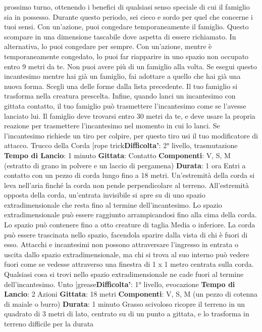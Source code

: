 \begin{multicols}{2}
prossimo turno, ottenendo i benefici di qualsiasi senso
speciale di cui il famiglio sia in possesso. Durante
questo periodo, sei cieco e sordo per quel che
concerne i tuoi sensi.
Con un’azione, puoi congedare temporaneamente il
famiglio. Questo scompare in una dimensione tascabile
dove aspetta di essere richiamato. In alternativa, lo puoi
congedare per sempre. Con un’azione, mentre è
temporaneamente congedato, lo puoi far riapparire in
uno spazio non occupato entro 9 metri da te.
Non puoi avere più di un famiglio alla volta. Se esegui
questo incantesimo mentre hai già un famiglio, fai
adottare a quello che hai già una nuova forma. Scegli
una delle forme dalla lista precedente. Il tuo famiglio si
trasforma nella creatura prescelta.
Infine, quando lanci un incantesimo con gittata contatto,
il tuo famiglio può trasmettere l’incantesimo come se
l’avesse lanciato lui. Il famiglio deve trovarsi entro 30
metri da te, e deve usare la propria reazione per
trasmettere l’incantesimo nel momento in cui lo lanci.
Se l’incantesimo richiede un tiro per colpire, per questo
tiro usi il tuo modificatore di attacco.
Trucco della Corda
[rope trick\textbf{Difficolta'}:
2° livello, trasmutazione
\textbf{Tempo di Lancio}: 1 minuto
\textbf{Gittata}: Contatto
\textbf{Componenti}: V, S, M (estratto di grano in polvere e un
laccio di pergamena)
\textbf{Durata}: 1 ora
Entri a contatto con un pezzo di corda lungo fino a 18
metri. Un’estremità della corda si leva nell’aria finché la
corda non pende perpendicolare al terreno.
All’estremità opposta della corda, un’entrata invisibile si
apre su di uno spazio extradimensionale che resta fino
al termine dell’incantesimo.
Lo spazio extradimensionale può essere raggiunto
arrampicandosi fino alla cima della corda. Lo spazio
può contenere fino a otto creature di taglia Media o
inferiore. La corda può essere trascinata nello spazio,
facendola sparire dalla vista di chi è fuori di esso.
Attacchi e incantesimi non possono attraversare
l’ingresso in entrata o uscita dallo spazio
extradimensionale, ma chi si trova al suo interno può
vedere fuori come se vedesse attraverso una finestra di
1 x 1 metro centrata sulla corda.
Qualsiasi cosa si trovi nello spazio extradimensionale
ne cade fuori al termine dell’incantesimo.
Unto
[grease\textbf{Difficolta'}:
1° livello, evocazione
\textbf{Tempo di Lancio}: 2 Azioni
\textbf{Gittata}: 18 metri
\textbf{Componenti}: V, S, M (un pezzo di cotenna di maiale o
burro)
\textbf{Durata}: 1 minuto
Grasso scivoloso ricopre il terreno in un quadrato di 3
metri di lato, centrato su di un punto a gittata, e lo
trasforma in terreno difficile per la durata

\end{multicols}
